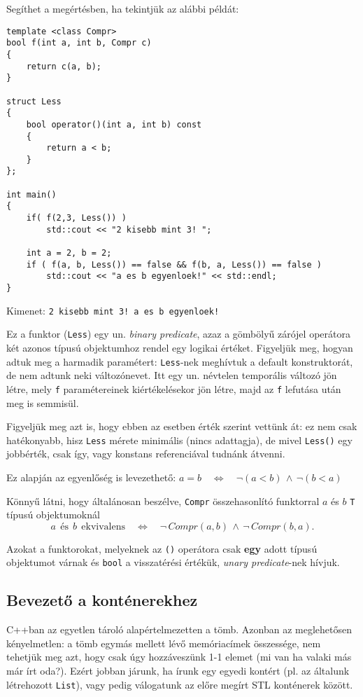 \documentclass[a4paper,11.5pt,table]{article}
\begin{document}
	Segíthet a megértésben, ha tekintjük az alábbi példát:
	\begin{lstlisting}
template <class Compr>
bool f(int a, int b, Compr c)
{
	return c(a, b);
}

struct Less
{
	bool operator()(int a, int b) const
	{
		return a < b;
	}
};

int main()
{
	if( f(2,3, Less()) )
		std::cout << "2 kisebb mint 3! ";
	
	int a = 2, b = 2;
	if ( f(a, b, Less()) == false && f(b, a, Less()) == false )
		std::cout << "a es b egyenloek!" << std::endl;
}
	\end{lstlisting}
	Kimenet: \texttt{2 kisebb mint 3! a es b egyenloek!}
	
	Ez a funktor (\texttt{Less}) egy un. \textit{binary predicate}, azaz a gömbölyű zárójel operátora két azonos típusú objektumhoz rendel egy logikai értéket. Figyeljük meg, hogyan adtuk meg a harmadik paramétert: \texttt{Less}-nek meghívtuk a default konstruktorát, de nem adtunk neki változónevet. Itt egy un. névtelen temporális változó jön létre, mely \texttt{f} paramétereinek kiértékelésekor jön létre, majd az \texttt{f} lefutása után meg is semmisül. 
	
	Figyeljük meg azt is, hogy ebben az esetben érték szerint vettünk át: ez nem csak hatékonyabb, hisz \texttt{Less} mérete minimális (nincs adattagja), de mivel \texttt{Less()} egy jobbérték, csak így, vagy konstans referenciával tudnánk átvenni.
	\smallskip
	
	Ez alapján az egyenlőség is levezethető: \quad $a = b \quad \Leftrightarrow \quad \neg(a<b)\, \wedge\, \neg(b<a)$
	\medskip
	
	Könnyű látni, hogy általánosan beszélve, \texttt{Compr} összehasonlító funktorral $a$ és $b$ \texttt{T} típusú objektumoknál
	\[ a\ \ \text{és}\ \ b\ \ \text{ekvivalens}\quad \Leftrightarrow\quad \neg \,Compr(a, b)\, \wedge\, \neg \,Compr(b, a). \]
	\begin{note}
		Azokat a funktorokat, melyeknek az \texttt{()} operátora csak \textbf{egy} adott típusú objektumot várnak és \texttt{bool} a visszatérési értékük, \textit{unary predicate}-nek hívjuk.
	\end{note}

	\subsection{Bevezető a konténerekhez}
	C++ban az egyetlen tároló alapértelmezetten a tömb. Azonban az meglehetősen kényelmetlen: a tömb egymás mellett lévő memóriacímek összessége, nem tehetjük meg azt, hogy csak úgy hozzáveszünk 1-1 elemet (mi van ha valaki más már írt oda?). Ezért jobban járunk, ha írunk egy egyedi kontért (pl. az általunk létrehozott \texttt{List}), vagy pedig válogatunk az előre megírt STL konténerek között.
	
\end{document}
